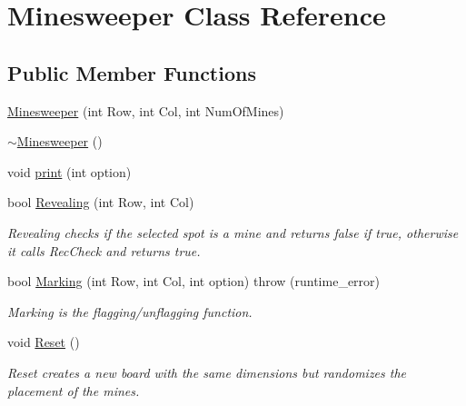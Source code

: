 \hypertarget{classMinesweeper}{}\section{Minesweeper Class Reference}
\label{classMinesweeper}
\subsection*{Public Member Functions}
\begin{DoxyCompactItemize}
\item 
\hyperlink{classMinesweeper_a9cb58f108f5f65317c5f7d60ead4e7ec}{Minesweeper} (int Row, int Col, int Num\+Of\+Mines)
\item 
\hyperlink{classMinesweeper_a79c2fcb860d486113e1b557e34dbb67d}{$\sim$\+Minesweeper} ()
\item 
void \hyperlink{classMinesweeper_a8abe207bf94f14d33c10dc88410e6f8c}{print} (int option)
\item 
bool \hyperlink{classMinesweeper_a4da8ec9ff58f3e663eed64ab70d523be}{Revealing} (int Row, int Col)
\begin{DoxyCompactList}\small\item\em Revealing checks if the selected spot is a mine and returns false if true, otherwise it calls Rec\+Check and returns true. \end{DoxyCompactList}\item 
bool \hyperlink{classMinesweeper_aa4de0f9fb93e5927bfbf1b2216f716ad}{Marking} (int Row, int Col, int option)  throw (runtime\+\_\+error)
\begin{DoxyCompactList}\small\item\em Marking is the flagging/unflagging function. \end{DoxyCompactList}\item 
void \hyperlink{classMinesweeper_a7bb8b53ca69cd4959e5123a07047702f}{Reset} ()
\begin{DoxyCompactList}\small\item\em Reset creates a new board with the same dimensions but randomizes the placement of the mines. \end{DoxyCompactList}\end{DoxyCompactItemize}
